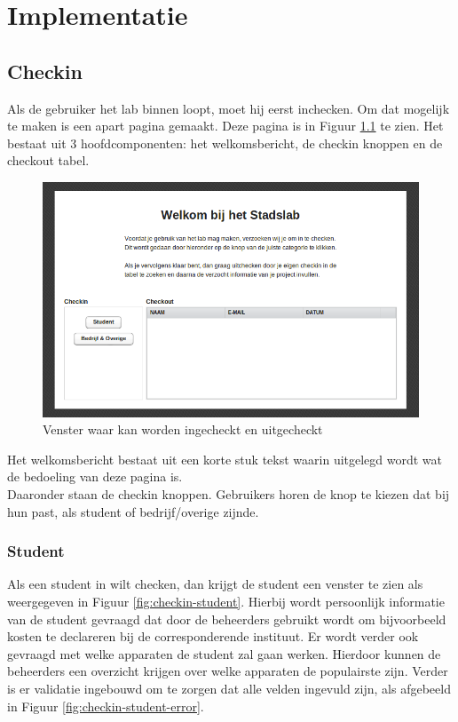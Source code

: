 \chapter{Implementatie}

\section{Checkin}

Als de gebruiker het lab binnen loopt, moet hij eerst inchecken. Om dat mogelijk te maken is een apart pagina gemaakt. Deze pagina is in 
Figuur \ref{fig:checkinoutview} te zien. Het bestaat uit 3 hoofdcomponenten: het welkomsbericht, de checkin knoppen en de checkout tabel.

\begin{figure}[Hh]
	\centering
	\includegraphics[width=\textwidth]{Images/checkinoutview2.png}
	\caption{Venster waar kan worden ingecheckt en uitgecheckt}
	\label{fig:checkinoutview}
\end{figure}

Het welkomsbericht bestaat uit een korte stuk tekst waarin uitgelegd wordt wat de bedoeling van deze pagina is. \\
Daaronder staan de checkin knoppen. Gebruikers horen de knop te kiezen dat bij hun past, als student of bedrijf/overige zijnde.\\ 

\subsection{Student}

Als een student in wilt checken, dan krijgt de student een venster te zien als weergegeven in Figuur \ref{fig:checkin-student}. Hierbij wordt persoonlijk informatie van de student gevraagd dat door de beheerders gebruikt wordt om bijvoorbeeld kosten te declareren bij de corresponderende instituut. Er wordt verder ook gevraagd met welke apparaten de student zal gaan werken. Hierdoor kunnen de beheerders een overzicht krijgen over welke apparaten de populairste zijn. Verder is er validatie ingebouwd om te zorgen dat alle velden ingevuld zijn, als afgebeeld in Figuur \ref{fig:checkin-student-error}. \\

